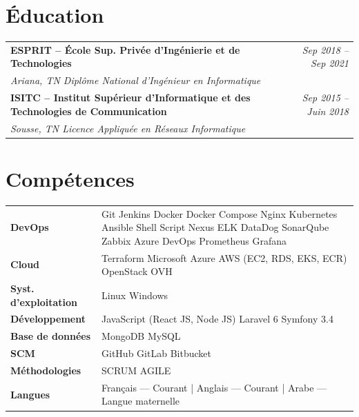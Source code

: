 \documentclass[a4paper,10pt]{article}
\begin{document}
\section{Éducation}
\begin{tabularx}{\linewidth}{@{}X r@{}}
  {\small\bfseries ESPRIT – École Sup. Privée d'Ingénierie et de Technologies} &
  {\footnotesize\itshape\color{cvgray} Sep 2018 – Sep 2021} \\
  {\footnotesize\itshape\color{cvgray} Ariana, TN \textemdash{} Diplôme National d'Ingénieur en Informatique} & \\[3pt]
  {\small\bfseries ISITC – Institut Supérieur d'Informatique et des Technologies de Communication} &
  {\footnotesize\itshape\color{cvgray} Sep 2015 – Juin 2018} \\
  {\footnotesize\itshape\color{cvgray} Sousse, TN \textemdash{} Licence Appliquée en Réseaux Informatique} & \\
\end{tabularx}

\section{Compétences}
\begin{tabularx}{\linewidth}{@{}p{3.8cm} X@{}}
  {\small\bfseries DevOps} &
  {\small Git \textbar{} Jenkins \textbar{} Docker \textbar{} Docker Compose \textbar{} Nginx \textbar{}
    Kubernetes \textbar{} Ansible \textbar{} Shell Script \textbar{} Nexus \textbar{} ELK \textbar{}
    DataDog \textbar{} SonarQube \textbar{} Zabbix \textbar{} Azure DevOps \textbar{} Prometheus \textbar{} Grafana} \\[2pt]
  {\small\bfseries Cloud} &
  {\small Terraform \textbar{} Microsoft Azure \textbar{} AWS (EC2, RDS, EKS, ECR) \textbar{} OpenStack \textbar{} OVH} \\[2pt]
  {\small\bfseries Syst. d'exploitation} &
  {\small Linux \textbar{} Windows} \\[2pt]
  {\small\bfseries Développement} &
  {\small JavaScript (React JS, Node JS) \textbar{} Laravel 6 \textbar{} Symfony 3.4} \\[2pt]
  {\small\bfseries Base de données} &
  {\small MongoDB \textbar{} MySQL} \\[2pt]
  {\small\bfseries SCM} &
  {\small GitHub \textbar{} GitLab \textbar{} Bitbucket} \\[2pt]
  {\small\bfseries Méthodologies} &
  {\small SCRUM \textbar{} AGILE} \\[2pt]
  {\small\bfseries Langues} &
  {\small Français — Courant \;|\; Anglais — Courant \;|\; Arabe — Langue maternelle} \\
\end{tabularx}
\end{document}
